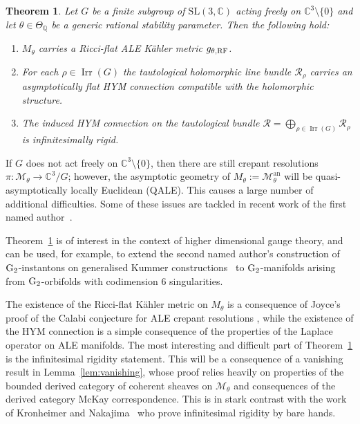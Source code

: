 \documentclass[pdftex]{sigma}
\numberwithin{equation}{section}
\newcommand{\rG}{{\rm G}}
\newcommand{\cR}{\mathcal{R}}
\newcommand{\sM}{\mathscr{M}}
\newcommand{\Q}{{\mathbb Q}}
\newcommand{\C}{{\mathbb C}}
\newcommand{\SL}{\mathrm{SL}}
\newcommand{\Irr}{\operatorname{Irr}}
\newcommand{\an}{\mathrm{an}}
\newtheorem{Theorem}{Theorem}[section]
\begin{document}
\begin{Theorem}
  \label{Thm_KRF_HYM}
  Let $G$ be a finite subgroup of $\SL(3, \C)$ acting freely on $\C^3{\setminus}\{0\}$ and let $\theta\in \Theta_{\Q}$ be a generic rational stability parameter.
  Then the following hold:
  \begin{enumerate}\itemsep=0pt
  \item[$(1)$]
    $M_\theta$ carries a Ricci-flat ALE K\"ahler metric $g_{\theta, \rm RF}$.
  \item[$(2)$]
    For each $\rho \in \Irr(G)$ the tautological holomorphic line bundle $\cR_{\rho}$ carries an asymptotically flat HYM connection compatible with the holomorphic structure.
  \item[$(3)$]
    The induced HYM connection on the tautological bundle $\cR=\bigoplus_{\rho\in\Irr(G)}\cR_\rho$ is infinitesimally rigid.
  \end{enumerate}
\end{Theorem}

\begin{Remark}
  If $G$ does not act freely on $\C^3{\setminus} \{0\}$, then there are still crepant resolutions $\pi\colon \sM_\theta \to \C^3\!/G$;
  however, the asymptotic geometry of $M_\theta := \sM_\theta^\an$ will be quasi-asymptotically locally Euclidean (QALE).
  This causes a large number of additional dif\/f\/iculties. Some of these
  issues are tackled in recent work of the f\/irst named author~\cite{Degeratu2014}.
\end{Remark}

\begin{Remark}
  Theorem~\ref{Thm_KRF_HYM} is of interest in the context of higher dimensional gauge theory, and can be used,  for example, to extend the second named author's construction of $\rG_2$-instantons on generalised Kummer constructions~\cite{Walpuski2013} to $\rG_2$-manifolds arising from $\rG_2$-orbifolds with codimension $6$ singularities.
\end{Remark}

The existence of the Ricci-f\/lat K\"ahler metric on $M_{\theta}$ is a consequence of Joyce's proof of the Calabi conjecture for ALE crepant resolutions \cite[Section~8]{Joyce2000}, while the existence of the HYM connection is a simple consequence of the properties of the Laplace operator on ALE manifolds.
The most interesting and dif\/f\/icult part of Theorem~\ref{Thm_KRF_HYM} is the inf\/initesimal rigidity statement.
This will be a consequence of a vanishing result in
Lemma~\ref{lem:vanishing}, whose proof relies heavily on properties of the bounded derived category of coherent sheaves on $\sM_\theta$ and consequences of the derived category McKay correspondence.
This is in stark contrast with the work of Kronheimer and Nakajima~\cite{Kronheimer1990} who prove inf\/initesimal rigidity by bare hands.
\end{document}
